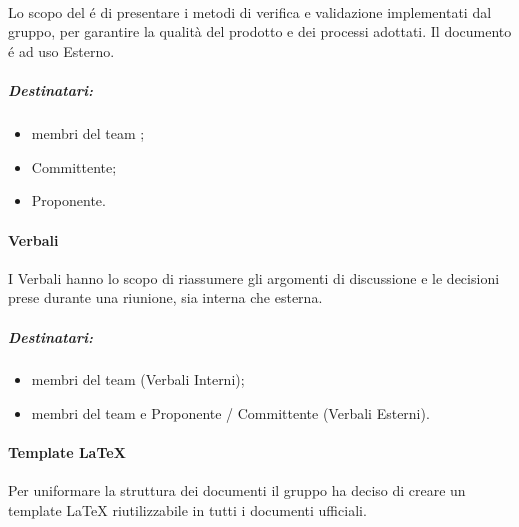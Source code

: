       \paragraph{\PdQ\\}
      Lo scopo del \textit{\PdQ{}} é di presentare i metodi di verifica e validazione implementati dal gruppo, per garantire la qualità del prodotto e dei processi adottati.
      Il documento é ad uso Esterno.
      \subparagraph*{Destinatari:}
      \begin{itemize}
        \item membri del team \Gruppo{};
        \item Committente;
        \item Proponente.
      \end{itemize}

      \paragraph{Verbali\\}
      I Verbali hanno lo scopo di riassumere gli argomenti di discussione e le decisioni prese durante una riunione, sia interna che esterna.
      \subparagraph*{Destinatari:}
      \begin{itemize}
        \item membri del team \Gruppo{} (Verbali Interni);
        \item membri del team \Gruppo{} e Proponente / Committente (Verbali Esterni).
      \end{itemize}

      \paragraph{Template \LaTeX\\}
      Per uniformare la struttura dei documenti il gruppo ha deciso di creare un template \LaTeX{} riutilizzabile in tutti i documenti ufficiali.


